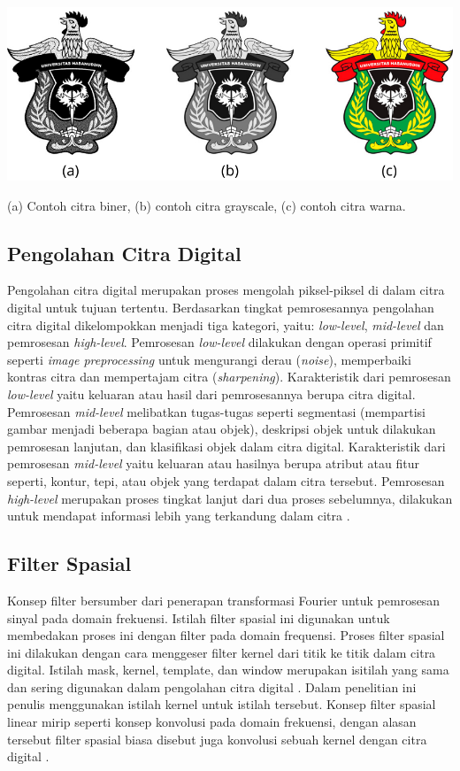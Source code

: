 \begin{afigure}
    \includegraphics[width=1\textwidth, center]{images/jenis-jenis-citra.png}
    \caption{(a) Contoh citra biner, (b) contoh citra grayscale, (c) contoh citra warna.}
    \label{fig:jenis-citra}
\end{afigure}


\subsection{Pengolahan Citra Digital}
Pengolahan citra digital merupakan proses mengolah piksel-piksel di dalam citra digital untuk tujuan tertentu. Berdasarkan tingkat pemrosesannya pengolahan citra digital dikelompokkan menjadi tiga kategori, yaitu: \textit{low-level}, \textit{mid-level} dan pemrosesan \textit{high-level}. Pemrosesan \textit{low-level} dilakukan dengan operasi primitif seperti \textit{image preprocessing} untuk mengurangi derau (\textit{noise}), memperbaiki kontras citra dan mempertajam citra (\textit{sharpening}). Karakteristik dari pemrosesan \textit{low-level} yaitu keluaran atau hasil dari pemrosesannya berupa citra digital. Pemrosesan \textit{mid-level} melibatkan tugas-tugas seperti segmentasi (mempartisi gambar menjadi beberapa bagian atau objek), deskripsi objek untuk dilakukan pemrosesan lanjutan, dan klasifikasi objek dalam citra digital. Karakteristik dari pemrosesan \textit{mid-level} yaitu keluaran atau hasilnya berupa atribut atau fitur seperti, kontur, tepi, atau objek yang terdapat dalam citra tersebut. Pemrosesan \textit{high-level} merupakan proses tingkat lanjut dari dua proses sebelumnya, dilakukan untuk mendapat informasi lebih yang terkandung dalam citra .

\subsection{Filter Spasial}
Konsep filter bersumber dari penerapan transformasi Fourier untuk pemrosesan sinyal pada domain frekuensi. Istilah filter spasial ini digunakan untuk membedakan proses ini dengan filter pada domain frequensi. Proses filter spasial ini dilakukan dengan cara menggeser filter kernel dari titik ke titik dalam citra digital. Istilah mask, kernel, template, dan window merupakan isitilah yang sama dan sering digunakan dalam pengolahan citra digital . Dalam penelitian ini penulis menggunakan istilah kernel untuk istilah tersebut.
Konsep filter spasial linear mirip seperti konsep konvolusi pada domain frekuensi, dengan alasan tersebut filter spasial biasa disebut juga konvolusi sebuah kernel dengan citra digital .

